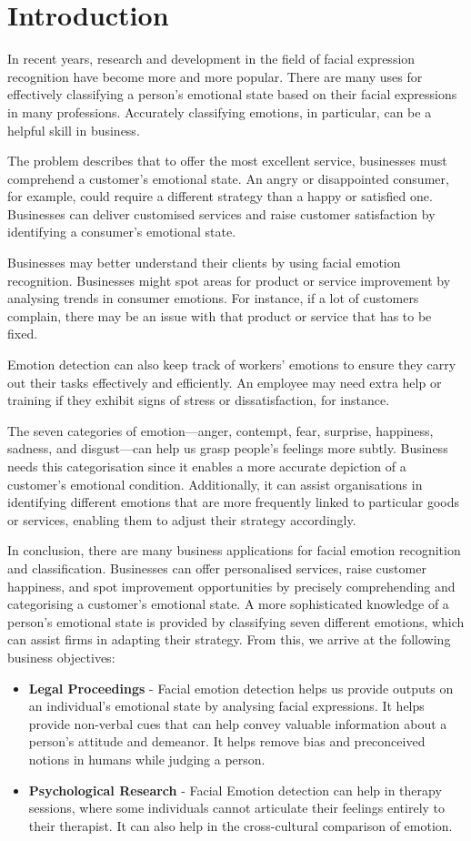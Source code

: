 \documentclass[11pt]{article}
\begin{document}
\section{Introduction}
\normalsize{In recent years, research and development in the field of facial expression recognition have become more and more popular. There are many uses for effectively classifying a person's emotional state based on their facial expressions in many professions. Accurately classifying emotions, in particular, can be a helpful skill in business.

The problem describes that to offer the most excellent service, businesses must comprehend a customer's emotional state. An angry or disappointed consumer, for example, could require a different strategy than a happy or satisfied one. Businesses can deliver customised services and raise customer satisfaction by identifying a consumer's emotional state.

Businesses may better understand their clients by using facial emotion recognition. Businesses might spot areas for product or service improvement by analysing trends in consumer emotions. For instance, if a lot of customers complain, there may be an issue with that product or service that has to be fixed.

Emotion detection can also keep track of workers' emotions to ensure they carry out their tasks effectively and efficiently. An employee may need extra help or training if they exhibit signs of stress or dissatisfaction, for instance.

The seven categories of emotion—anger, contempt, fear, surprise, happiness, sadness, and disgust—can help us grasp people's feelings more subtly. Business needs this categorisation since it enables a more accurate depiction of a customer's emotional condition. Additionally, it can assist organisations in identifying different emotions that are more frequently linked to particular goods or services, enabling them to adjust their strategy accordingly.

In conclusion, there are many business applications for facial emotion recognition and classification. Businesses can offer personalised services, raise customer happiness, and spot improvement opportunities by precisely comprehending and categorising a customer's emotional state. A more sophisticated knowledge of a person's emotional state is provided by classifying seven different emotions, which can assist firms in adapting their strategy.
From this, we arrive at the following business objectives:
\begin{itemize}
    \item \textbf{Legal Proceedings} - Facial emotion detection helps us provide outputs on an individual’s emotional state by analysing facial expressions. It helps provide non-verbal cues that can help convey valuable information about a person’s attitude and demeanor. It helps remove bias and preconceived notions in humans while judging a person. \cite{legal}
    \item \textbf{Psychological Research} - Facial Emotion detection can help in therapy sessions, where some individuals cannot articulate their feelings entirely to their therapist. It can also help in the cross-cultural comparison of emotion.
\end{itemize}
}
\end{document}
